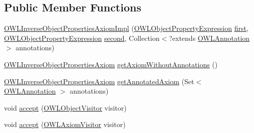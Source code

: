 \subsection*{Public Member Functions}
\begin{DoxyCompactItemize}
\item 
\hyperlink{classuk_1_1ac_1_1manchester_1_1cs_1_1owl_1_1owlapi_1_1_o_w_l_inverse_object_properties_axiom_impl_ab35cf6a6d706b23e6682abdcf993b33a}{O\-W\-L\-Inverse\-Object\-Properties\-Axiom\-Impl} (\hyperlink{interfaceorg_1_1semanticweb_1_1owlapi_1_1model_1_1_o_w_l_object_property_expression}{O\-W\-L\-Object\-Property\-Expression} \hyperlink{classuk_1_1ac_1_1manchester_1_1cs_1_1owl_1_1owlapi_1_1_o_w_l_inverse_object_properties_axiom_impl_ada71fd5f5ef70e63d611fbe578e67eef}{first}, \hyperlink{interfaceorg_1_1semanticweb_1_1owlapi_1_1model_1_1_o_w_l_object_property_expression}{O\-W\-L\-Object\-Property\-Expression} \hyperlink{classuk_1_1ac_1_1manchester_1_1cs_1_1owl_1_1owlapi_1_1_o_w_l_inverse_object_properties_axiom_impl_a374ea4f80e6d00fb7cf293e560f9dae1}{second}, Collection$<$?extends \hyperlink{interfaceorg_1_1semanticweb_1_1owlapi_1_1model_1_1_o_w_l_annotation}{O\-W\-L\-Annotation} $>$ annotations)
\item 
\hyperlink{interfaceorg_1_1semanticweb_1_1owlapi_1_1model_1_1_o_w_l_inverse_object_properties_axiom}{O\-W\-L\-Inverse\-Object\-Properties\-Axiom} \hyperlink{classuk_1_1ac_1_1manchester_1_1cs_1_1owl_1_1owlapi_1_1_o_w_l_inverse_object_properties_axiom_impl_a2f408a7812b61617ddb2236effbdada1}{get\-Axiom\-Without\-Annotations} ()
\item 
\hyperlink{interfaceorg_1_1semanticweb_1_1owlapi_1_1model_1_1_o_w_l_inverse_object_properties_axiom}{O\-W\-L\-Inverse\-Object\-Properties\-Axiom} \hyperlink{classuk_1_1ac_1_1manchester_1_1cs_1_1owl_1_1owlapi_1_1_o_w_l_inverse_object_properties_axiom_impl_a0d61557cbc54ea2ef629352ddbbb394c}{get\-Annotated\-Axiom} (Set$<$ \hyperlink{interfaceorg_1_1semanticweb_1_1owlapi_1_1model_1_1_o_w_l_annotation}{O\-W\-L\-Annotation} $>$ annotations)
\item 
void \hyperlink{classuk_1_1ac_1_1manchester_1_1cs_1_1owl_1_1owlapi_1_1_o_w_l_inverse_object_properties_axiom_impl_a9895d64d63ce0d05ab621337a89aea6b}{accept} (\hyperlink{interfaceorg_1_1semanticweb_1_1owlapi_1_1model_1_1_o_w_l_object_visitor}{O\-W\-L\-Object\-Visitor} visitor)
\item 
void \hyperlink{classuk_1_1ac_1_1manchester_1_1cs_1_1owl_1_1owlapi_1_1_o_w_l_inverse_object_properties_axiom_impl_a032a5af5942dd60db3da98c8ac078961}{accept} (\hyperlink{interfaceorg_1_1semanticweb_1_1owlapi_1_1model_1_1_o_w_l_axiom_visitor}{O\-W\-L\-Axiom\-Visitor} visitor)

\end{DoxyCompactItemize}
